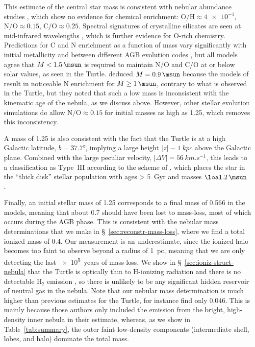 \documentclass[useAMS, usenatbib]{mnras}
\newcommand*\chem[1]{\ensuremath{\mathrm{#1}}}
\begin{document}
This estimate of the central star mass is consistent with nebular abundance studies
\citep{Liu:2004a, Pottasch:2009a, Delgado-Inglada:2009a, Bohigas:2015c}, which show no evidence for chemical enrichment: \(\chem{O/H} \approx \num{4e-4}\), \(\chem{N/O} \approx 0.15\), \(\chem{C/O} \approx 0.25\).
Spectral signatures of crystalline silicates are seen at mid-infrared wavelengths
\citep{Delgado-Inglada:2014a}, which is further evidence for O-rich chemistry.
Predictions for C and N enrichment as a function of mass
vary significantly with initial metallicity
and between different AGB evolution codes \citep[Figs.~8 and 9 of][]{Henry:2018a},
but all models agree that \(M < \SI{1.5}{\msun}\) is required to maintain \chem{N/O} and \chem{C/O} at or below solar values, as seen in the Turtle.
\citet{Pottasch:2009a} deduced \(M = \SI{0.9}{\msun}\) because the models of \citet{Karakas:2007a} result in noticeable N enrichment for \(M \ge \SI{1}{\msun}\),
contrary to what is observed in the Turtle,
but they noted that such a low mass is inconsistent with the kinematic age of the nebula,
as we discuss above.
However, other stellar evolution simulations \citep{Ventura:2005a, Di-Criscienzo:2016a}
do allow \(\chem{N/O} \approx 0.15\) for initial masses as high as \SI{1.25}{\msun},
which removes this inconsistency.

A mass of \SI{1.25}{\msun} is also consistent with the fact that the Turtle is at a high Galactic latitude, \(b = \ang{37.7}\),
implying a large height \(|z| \sim \SI{1}{kpc} \) above the Galactic plane.
Combined with the large peculiar velocity, \(|\Delta V| = \SI{56}{km.s^{-1}}\),
this leads to a classification as Type~III \citep{Quireza:2007a} according to the scheme of \citet{Peimbert:1978a},
which places the star in the ``thick disk'' stellar population
with ages \SI{> 5}{Gyr}
and masses \(\loa \SI{1.2}{\msun}\) \citep{Maciel:1994b, Stanghellini:2018a}.

Finally, an initial stellar mass of \SI{1.25}{\msun} corresponds to a final mass of \SI{0.566}{\msun} in the \citet{Miller-Bertolami:2016a} models,
meaning that about \SI{0.7}{\msun} should have been lost to mass-loss,
most of which occurs during the AGB phase.
This is consistent with the nebular mass determinations that we make in \S~\ref{sec:reconstr-mass-loss},
where we find a total ionized mass of \SI{0.4}{\msun}.
Our measurement is an underestimate,
since the ionized halo becomes too faint to observe beyond a radius of \SI{1}{pc},
meaning that we are only detecting the last \SI{e5}{years} of mass loss.
We show in \S~\ref{sec:ioniz-struct-nebula} that the Turtle is optically thin to H-ionizing radiation and there is no detectable \chem{H_2} emission \citep{Kastner:1996a},
so there is unlikely to be any significant hidden reservoir of neutral gas in the nebula.
Note that our nebular mass determination is much higher than previous estimates for the Turtle,
for instance \citep{Bohigas:2015c} find only \SI{0.046}{\msun}.
This is mainly because those authors only included the emission from the bright,
high-density inner nebula in their estimate,
whereas, as we show in Table~\ref{tab:summary}, the outer faint low-density components
(intermediate shell, lobes, and halo) dominate the total mass.
\end{document}
